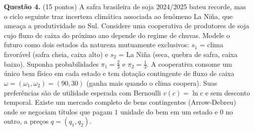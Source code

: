 
\textbf{Questão 4.} (15 pontos) A safra brasileira de soja 2024/2025 bateu recorde, mas o ciclo seguinte traz incerteza climática associada ao fenômeno La Niña, que ameaça a produtividade no Sul. Considere uma cooperativa de produtores de soja cujo fluxo de caixa do próximo ano depende do regime de chuvas. Modele o futuro como dois estados da natureza mutuamente exclusivos: $s_1$ = clima favorável (safra cheia, caixa alto) e $s_2$ = La Niña (seca, quebra de safra, caixa baixo). Suponha probabilidades $\pi_1=\tfrac23$ e $\pi_2=\tfrac13$. A cooperativa consome um único bem físico em cada estado e tem dotação contingente de fluxo de caixa $\omega=(\omega_1,\omega_2)=(90,30)$ (ganha mais quando o clima coopera). Suas preferências são de utilidade esperada com Bernoulli $v(c)=\ln c$ e sem desconto temporal. Existe um mercado completo de bens contingentes (Arrow-Debreu) onde se negociam títulos que pagam $1$ unidade do bem em um estado e $0$ no outro, a preços $q=(q_1,q_2)$.

